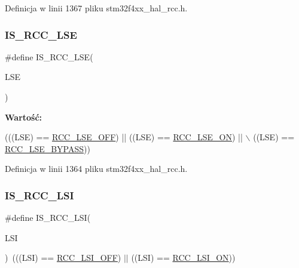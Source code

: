 Definicja w linii 1367 pliku stm32f4xx\+\_\+hal\+\_\+rcc.\+h.

\mbox{\label{group___r_c_c___i_s___r_c_c___definitions_ga95d2678bf8f46e932e7cba75619a4d2c}} 
\subsubsection{\texorpdfstring{I\+S\+\_\+\+R\+C\+C\+\_\+\+L\+SE}{IS\_RCC\_LSE}}
{\footnotesize\ttfamily \#define I\+S\+\_\+\+R\+C\+C\+\_\+\+L\+SE(\begin{DoxyParamCaption}\item[{}]{L\+SE }\end{DoxyParamCaption})}

{\bfseries Wartość\+:}
\begin{DoxyCode}
(((LSE) == \hyperlink{group___r_c_c___l_s_e___config_ga6645c27708d0cad1a4ab61d2abb24c77}{RCC\_LSE\_OFF}) || ((LSE) == \hyperlink{group___r_c_c___l_s_e___config_gac981ea636c2f215e4473901e0912f55a}{RCC\_LSE\_ON}) || \(\backslash\)
                         ((LSE) == \hyperlink{group___r_c_c___l_s_e___config_gaad580157edbae878edbcc83c5a68e767}{RCC\_LSE\_BYPASS}))
\end{DoxyCode}


Definicja w linii 1364 pliku stm32f4xx\+\_\+hal\+\_\+rcc.\+h.

\mbox{\label{group___r_c_c___i_s___r_c_c___definitions_gaaa7381dd9821c69346ce64453863b786}} 
\subsubsection{\texorpdfstring{I\+S\+\_\+\+R\+C\+C\+\_\+\+L\+SI}{IS\_RCC\_LSI}}
{\footnotesize\ttfamily \#define I\+S\+\_\+\+R\+C\+C\+\_\+\+L\+SI(\begin{DoxyParamCaption}\item[{}]{L\+SI }\end{DoxyParamCaption})~(((L\+SI) == \hyperlink{group___r_c_c___l_s_i___config_gaa1710927d79a2032f87f039c4a27356a}{R\+C\+C\+\_\+\+L\+S\+I\+\_\+\+O\+FF}) $\vert$$\vert$ ((L\+SI) == \hyperlink{group___r_c_c___l_s_i___config_ga6b364ac3500e60b6bff695ee518c87d6}{R\+C\+C\+\_\+\+L\+S\+I\+\_\+\+ON}))}



